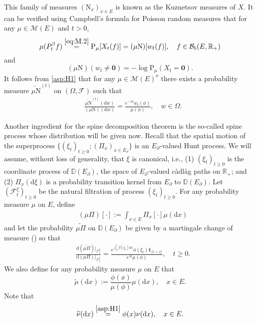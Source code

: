 \documentclass[12pt,a4paper]{amsart}
\numberwithin{equation}{section}
\theoremstyle{plain}
\theoremstyle{definition}
\theoremstyle{remark}
\begin{document}
	This family of measures $(\mathrm N_x)_{x\in E}$ is known as the Kuznetsov measures of $X$.
	It can be verified using Campbell's formula for Poisson random measures that for any $\mu\in \mathcal M(E)$ and $t>0$,
\begin{equation} \label{eq:E.13}
	\mu(P_t^\beta f)
	\overset{\eqref{eq:M.2}}= \mathrm P_\mu[X_t(f)]
	=(\mu \mathrm N) [w_t(f)],
	\quad f\in \mathcal B_b(E, \mathbb R_+)
\end{equation}
	and
\begin{equation} \label{eq:E.14}
	(\mu\mathrm N) (w_t\neq \mathbf 0)
	= - \log \mathrm P_{\mu}(X_t = \mathbf 0).
\end{equation}
	It follows from \eqref{asp:H1} that for any $\mu\in \mathcal M(E)^o$ there exists a probability measure $\widetilde {\mu \mathrm N}^{(t)}$ on $(\Omega, \mathscr F)$ such that
	\begin{align}\label{eq:E.15}
	& \frac{\widetilde {\mu \mathrm N}^{(t)}(\mathrm dw) }{(\mu \mathrm N)(\mathrm dw)}
	= \frac{e^{-\lambda t}w_t(\phi)}{\mu(\phi)}, \quad w\in \Omega.
	\end{align}

	Another ingredient for the spine decomposition theorem is the so-called spine process whose distribution will be given now.
	Recall that the spatial motion of the superprocess $\{(\xi_t)_{t\geq 0}; (\Pi_x)_{x\in E_\partial}\}$ is an $E_\partial$-valued Hunt process.
	We will assume, without loss of generality, that $\xi$ is canonical,  i.e., (1) $(\xi_t)_{t\geq 0}$ is the coordinate process of
	$\mathbb D(E_\partial)$,
	the space of $E_\partial$-valued c\`adl\`ag paths on $\mathbb R_+$; and
	(2) $\Pi_x(\mathrm d\xi)$ is a probability transition kernel from $E_\partial$ to $\mathbb D(E_\partial)$.
	Let  $(\mathscr F_t^{\xi})_{t\geq 0}$ be the natural filtration of process $(\xi_t)_{t\geq 0}$.
	For any probability measure $\mu$ on $E$, define
\begin{align}
	& (\mu \Pi)[\cdot] :=
	\int_{x\in E} \Pi_x[\cdot]\mu(\mathrm dx)
\end{align}
and let the probability $\widetilde {\mu \Pi}$ on $\mathbb D(E_\partial)$ be given by a martingale change of measure (\cite[Lemma 18.18]{Kallenberg2002Foundations}) so that
\begin{align}
	&  \frac{\mathrm d (\widetilde{\mu \Pi})|_{\mathscr F^\xi_t}}{\mathrm d (\mu \Pi)|_{\mathscr F^\xi_t}}
	=\frac{e^{\int_0^t \beta(\xi_s)ds}\phi(\xi_t) \mathbf 1_{\{t<\zeta\}}}{e^{\lambda t}\mu(\phi)},
	\quad t\geq 0.
\end{align}
We also define for any probability measure $\mu$ on $E$ that
\begin{equation}
	\widetilde \mu(\mathrm dx)
	:= \frac{\phi(x)}{\mu(\phi)} \mu(\mathrm dx),
	\quad x\in E.
\end{equation}
Note that
\begin{equation} \label{eq:E.162}
	\widetilde \nu(\mathrm dx)
	\overset{\eqref{asp:H1}}= \phi(x) \nu(\mathrm dx),
	\quad x\in E.
\end{equation}
\end{document}

